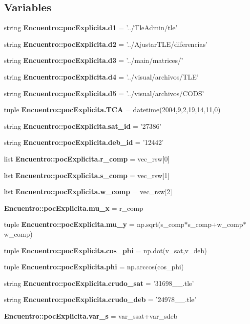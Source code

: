 \subsection*{\-Variables}
\begin{DoxyCompactItemize}
\item 
string {\bf \-Encuentro\-::poc\-Explicita.\-d1} = '../\-Tle\-Admin/tle'
\item 
string {\bf \-Encuentro\-::poc\-Explicita.\-d2} = '../\-Ajustar\-T\-L\-E/diferencias'
\item 
string {\bf \-Encuentro\-::poc\-Explicita.\-d3} = '../main/matrices/'
\item 
string {\bf \-Encuentro\-::poc\-Explicita.\-d4} = '../visual/archivos/\-T\-L\-E'
\item 
string {\bf \-Encuentro\-::poc\-Explicita.\-d5} = '../visual/archivos/\-C\-O\-D\-S'
\item 
tuple {\bf \-Encuentro\-::poc\-Explicita.\-T\-C\-A} = datetime(2004,9,2,19,14,11,0)
\item 
string {\bf \-Encuentro\-::poc\-Explicita.\-sat\-\_\-id} = '27386'
\item 
string {\bf \-Encuentro\-::poc\-Explicita.\-deb\-\_\-id} = '12442'
\item 
list {\bf \-Encuentro\-::poc\-Explicita.\-r\-\_\-comp} = vec\-\_\-rsw[0]
\item 
list {\bf \-Encuentro\-::poc\-Explicita.\-s\-\_\-comp} = vec\-\_\-rsw[1]
\item 
list {\bf \-Encuentro\-::poc\-Explicita.\-w\-\_\-comp} = vec\-\_\-rsw[2]
\item 
{\bf \-Encuentro\-::poc\-Explicita.\-mu\-\_\-x} = r\-\_\-comp
\item 
tuple {\bf \-Encuentro\-::poc\-Explicita.\-mu\-\_\-y} = np.\-sqrt(s\-\_\-comp$\ast$s\-\_\-comp+w\-\_\-comp$\ast$w\-\_\-comp)
\item 
tuple {\bf \-Encuentro\-::poc\-Explicita.\-cos\-\_\-phi} = np.\-dot(v\-\_\-sat,v\-\_\-deb)
\item 
tuple {\bf \-Encuentro\-::poc\-Explicita.\-phi} = np.\-arccos(cos\-\_\-phi)
\item 
string {\bf \-Encuentro\-::poc\-Explicita.\-crudo\-\_\-sat} = '31698\-\_\-\_.\-tle'
\item 
string {\bf \-Encuentro\-::poc\-Explicita.\-crudo\-\_\-deb} = '24978\-\_\-\_.\-tle'
\item 
{\bf \-Encuentro\-::poc\-Explicita.\-var\-\_\-s} = var\-\_\-ssat+var\-\_\-sdeb
\item 

\end{DoxyCompactItemize}
